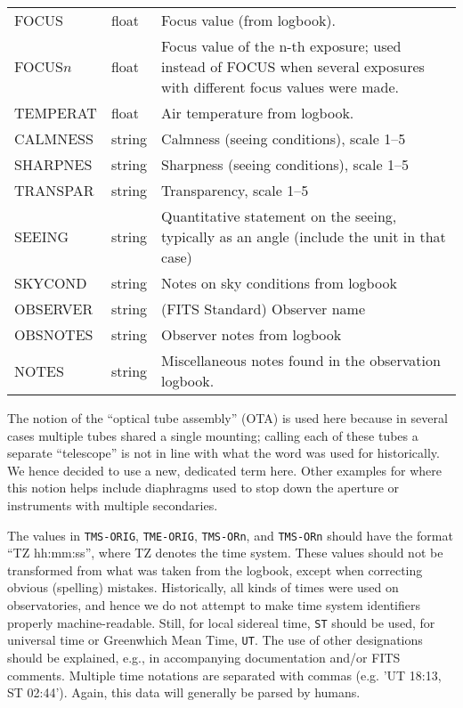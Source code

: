 \documentclass[11pt]{ivoa}
\newcommand\cardname[1]{\texttt{\color{keyword}#1}}
\begin{document}
\begin{longtable}{llp{}}
FOCUS     &float   & Focus value (from logbook).\\
FOCUS$n$  &float   &
  Focus value of the n-th exposure; used instead of FOCUS when several
  exposures with different focus values were made.\\
TEMPERAT  &float   &Air temperature from logbook.\\
CALMNESS  &string  &
  Calmness (seeing conditions), scale 1–5\\
SHARPNES  &string  &Sharpness (seeing conditions), scale 1–5\\
TRANSPAR  &string  &
  Transparency, scale 1–5\\
SEEING    &string  &Quantitative statement on the seeing, typically as
  an angle (include the unit in that case)\\
SKYCOND   &string  &Notes on sky conditions from logbook\\
OBSERVER  &string  &(FITS Standard) Observer name\\
OBSNOTES  &string  &Observer notes from logbook\\
NOTES     &string  &Miscellaneous notes found in the observation
logbook.\\
\end{longtable}
\endgroup

The notion of the ``optical tube assembly'' (OTA) is used here because
in several cases multiple tubes shared a single mounting; calling each of
these tubes a separate ``telescope'' is not in line with what the word
was used for historically.  We hence decided to use a new, dedicated
term here.  Other examples for where this notion helps include
diaphragms used to stop down the aperture or instruments with multiple
secondaries.

The values in \cardname{TMS-ORIG}, \cardname{TME-ORIG},
\cardname{TMS-ORn}, and \cardname{TMS-ORn} should have the format
``TZ hh:mm:ss'', where TZ denotes the time system. These values should not be
transformed from what was taken from the logbook, except when
correcting obvious (spelling) mistakes.  Historically, all kinds of
times were used on observatories, and hence we do not attempt to make
time system identifiers properly machine-readable.  Still, for
local sidereal time, \verb|ST| should be used, for universal time or
Greenwhich Mean Time, \verb|UT|.  The use of other designations should
be explained, e.g., in accompanying documentation and/or FITS comments.
Multiple time notations are separated with commas (e.g. 'UT 18:13, ST
02:44').  Again, this data will generally be parsed by humans.
\end{document}

